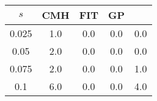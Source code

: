 \centering \begin{tabular}{c|c|c|c|c}
$s$	&CMH	&FIT	&GP	&\sc{Clear}\\\hline
0.025	&1.0	&0.0	&0.0	&0.0\\
0.05	&2.0	&0.0	&0.0	&0.0\\
0.075	&2.0	&0.0	&0.0	&1.0\\
0.1	&6.0	&0.0	&0.0	&4.0\\
\end{tabular}
